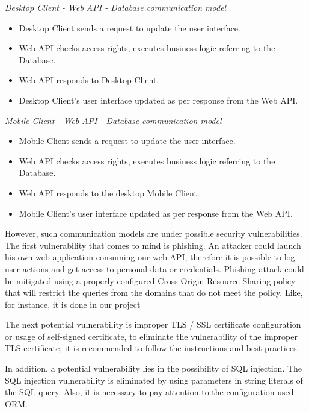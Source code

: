 \textit{Desktop Client - Web API - Database communication model}
\begin{itemize}
    \item Desktop Client sends a request to update the user interface.
    \item Web API checks access rights, executes business logic referring to the Database.
    \item Web API responds to Desktop Client.
    \item Desktop Client's user interface updated as per response from the Web API\@.
\end{itemize}

\textit{Mobile Client - Web API - Database communication model}
\begin{itemize}
    \item Mobile Client sends a request to update the user interface.
    \item Web API checks access rights, executes business logic referring to the Database.
    \item Web API responds to the desktop Mobile Client.
    \item Mobile Client's user interface updated as per response from the Web API\@.
\end{itemize}

However, such communication models are under possible security vulnerabilities.
The first vulnerability that comes to mind is phishing.
An attacker could launch his own web application consuming our web API, therefore it is possible to log user actions
and get access to personal data or credentials.
Phishing attack could be mitigated using a properly configured Cross-Origin Resource Sharing policy that will restrict
the queries from the domains that do not meet the policy.
Like, for instance, it is done in our project



The next potential vulnerability is improper TLS / SSL certificate configuration or usage of self-signed certificate,
to eliminate the vulnerability of the improper TLS certificate, it is recommended to follow the instructions and
\href{https://www.ssl.com/guide/ssl-best-practices/}{best practices}.

In addition, a potential vulnerability lies in the possibility of SQL injection.
The SQL injection vulnerability is eliminated by using parameters in string literals of the SQL query.
Also, it is necessary to pay attention to the configuration used ORM\@.

